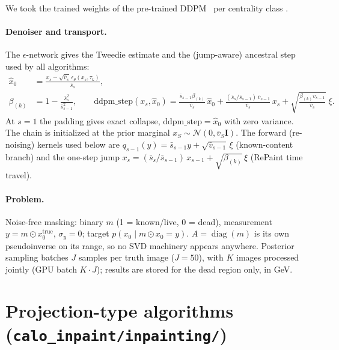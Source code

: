 \documentclass[11pt]{article}
\begin{document}
We took the trained weights of the pre-trained DDPM~\cite{ho2020ddpm} per centrality class \cite{torbunov2024calo}. 

\paragraph{Denoiser and transport.}
The $\epsilon$-network gives the Tweedie estimate and the (jump-aware)
ancestral step used by all algorithms:
\begin{align}
  \hat x_0 &= \frac{x_s - \sqrt{\bar v_s}\,
              \epsilon_\theta(x_s, \tau_k)}{\bar s_s},
  \label{eq:x0hat}\\
  \beta_{(k)} &= 1 - \frac{\bar s_s^2}{\bar s_{s-1}^2}, \qquad
  \mathrm{ddpm\_step}(x_s, \hat x_0) =
      \frac{\bar s_{s-1}\beta_{(k)}}{\bar v_s}\,\hat x_0
    + \frac{(\bar s_s/\bar s_{s-1})\,\bar v_{s-1}}{\bar v_s}\, x_s
    + \sqrt{\tfrac{\beta_{(k)}\bar v_{s-1}}{\bar v_s}}\;\xi .
  \label{eq:ddpmstep}
\end{align}
At $s = 1$ the padding gives exact collapse,
$\mathrm{ddpm\_step} = \hat x_0$ with zero variance.  The chain is
initialized at the prior marginal $x_S \sim \mathcal{N}(0, \bar v_S
\mathbf{I})$.  The forward (re-noising) kernels used below are
$q_{s-1}(y) = \bar s_{s-1} y + \sqrt{\bar v_{s-1}}\,\xi$
(known-content branch) and the one-step jump
$x_s = (\bar s_s/\bar s_{s-1})\,x_{s-1} + \sqrt{\beta_{(k)}}\,\xi$
(RePaint time travel).

\paragraph{Problem.}
Noise-free masking: binary $m$ (1 = known/live, 0 = dead),
measurement $y = m \odot x_0^{\mathrm{true}}$, $\sigma_y = 0$; target
$p(x_0 \mid m \odot x_0 = y)$.  $A = \operatorname{diag}(m)$ is its own
pseudoinverse on its range, so no SVD machinery appears anywhere.
Posterior sampling batches $J$ samples per truth image ($J = 50$), with
$K$ images processed jointly (GPU batch $K \! \cdot \! J$); results are
stored for the dead region only, in GeV.

\section{Projection-type algorithms
         (\texttt{calo\_inpaint/inpainting/})}
\label{sec:projection}
\end{document}
